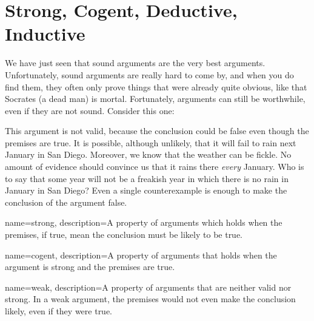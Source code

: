 \section{Strong, Cogent, Deductive, Inductive}\label{sec:strongcogent}

We have just seen that sound arguments are the very best arguments. Unfortunately, sound arguments are really hard to come by, and when you do find them, they often only prove things that were already quite obvious, like that Socrates (a dead man) is mortal. Fortunately, arguments can still be worthwhile, even if they are not sound. Consider this one:

\begin{kormanize}
\end{kormanize}


This argument is not valid, because the conclusion could be false even though the premises are true. It is possible, although unlikely, that it will fail to rain next January in San Diego. Moreover, we know that the weather can be fickle. No amount of evidence should convince us that it rains there \emph{every} January. Who is to say that some year will not be a freakish year in which there is no rain in January in San Diego? Even a single counterexample is enough to make the conclusion of the argument false.

{
name=strong,
description={A property of arguments which holds when the premises, if true, mean the conclusion must be likely to be true.}
}


{
name=cogent,
description={A property of arguments that holds when the argument is strong and the premises are true.}
}



{
name=weak,
description={A property of arguments that are neither valid nor strong. In a weak argument, the premises would not even make the conclusion likely, even if they were true.}
}



